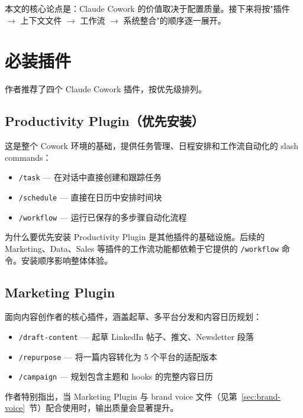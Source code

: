 \documentclass[a4paper]{article}
\begin{document}
本文的核心论点是：Claude Cowork 的价值取决于配置质量。接下来将按"插件 $\to$ 上下文文件 $\to$ 工作流 $\to$ 系统整合"的顺序逐一展开。

\section{必装插件}

作者推荐了四个 Claude Cowork 插件，按优先级排列。

\subsection{Productivity Plugin（优先安装）}

这是整个 Cowork 环境的基础，提供任务管理、日程安排和工作流自动化的 slash commands：

\begin{itemize}
    \item \texttt{/task} --- 在对话中直接创建和跟踪任务
    \item \texttt{/schedule} --- 直接在日历中安排时间块
    \item \texttt{/workflow} --- 运行已保存的多步骤自动化流程
\end{itemize}

\begin{knowledgebox}{为什么要优先安装}
Productivity Plugin 是其他插件的基础设施。后续的 Marketing、Data、Sales 等插件的工作流功能都依赖于它提供的 \texttt{/workflow} 命令。安装顺序影响整体体验。
\end{knowledgebox}

\subsection{Marketing Plugin}

面向内容创作者的核心插件，涵盖起草、多平台分发和内容日历规划：

\begin{itemize}
    \item \texttt{/draft-content} --- 起草 LinkedIn 帖子、推文、Newsletter 段落
    \item \texttt{/repurpose} --- 将一篇内容转化为 5 个平台的适配版本
    \item \texttt{/campaign} --- 规划包含主题和 hooks 的完整内容日历
\end{itemize}

作者特别指出，当 Marketing Plugin 与 brand voice 文件（见第~\ref{sec:brand-voice}~节）配合使用时，输出质量会显著提升。
\end{document}
